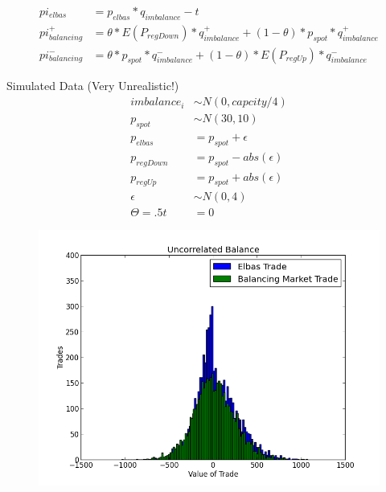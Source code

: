 \documentclass{beamer}
\begin{document}
\begin{frame}[plain]
		\begin{align*}
		 pi_{elbas} &= p_{elbas} * q_{imbalance} - t \\
		 pi_{balancing}^{+} &=  \theta*E(P_{regDown})*q_{imbalance}^{+} + (1-\theta)*p_{spot}*q_{imbalance}^{+}\\
		 pi_{balancing}^{-} &= \theta*p_{spot}*q_{imbalance}^{-} + (1-\theta)*E(P_{regUp})*q_{imbalance}^{-}
		\end{align*}
\end{frame}

\begin{frame}[plain]
	Simulated Data (Very Unrealistic!)
		\begin{align*}
		 imbalance_i & \sim N(0, capcity/4)\\
		 p_{spot} & \sim N(30, 10)\\
		 p_{elbas} &= p_{spot} + \epsilon\\
		 p_{regDown} &= p_{spot} - abs(\epsilon) \\
		 p_{regUp} &= p_{spot} + abs(\epsilon) \\
		 \epsilon &\sim N(0,4) \\
		 \Theta = .5
		 t&=0
		\end{align*}
\end{frame}

\begin{frame}[plain]
	\begin{figure}
	\includegraphics[width=1\textwidth]{figures/elbas_model_a.png}
	\end{figure}
\end{frame}
\end{document}
